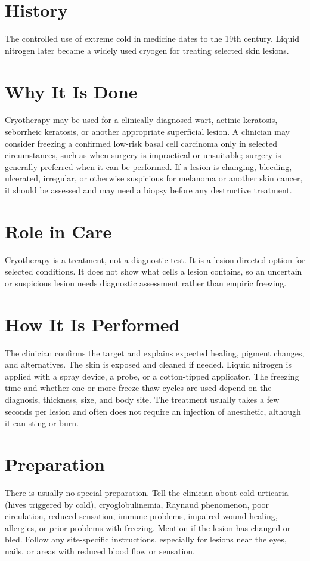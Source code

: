 \section*{History}
The controlled use of extreme cold in medicine dates to the 19th century. Liquid nitrogen later became a widely used cryogen for treating selected skin lesions.

\section*{Why It Is Done}
Cryotherapy may be used for a clinically diagnosed wart, actinic keratosis, seborrheic keratosis, or another appropriate superficial lesion. A clinician may consider freezing a confirmed low-risk basal cell carcinoma only in selected circumstances, such as when surgery is impractical or unsuitable; surgery is generally preferred when it can be performed. If a lesion is changing, bleeding, ulcerated, irregular, or otherwise suspicious for melanoma or another skin cancer, it should be assessed and may need a biopsy before any destructive treatment.

\section*{Role in Care}
Cryotherapy is a treatment, not a diagnostic test. It is a lesion-directed option for selected conditions. It does not show what cells a lesion contains, so an uncertain or suspicious lesion needs diagnostic assessment rather than empiric freezing.

\section*{How It Is Performed}
The clinician confirms the target and explains expected healing, pigment changes, and alternatives. The skin is exposed and cleaned if needed. Liquid nitrogen is applied with a spray device, a probe, or a cotton-tipped applicator. The freezing time and whether one or more freeze-thaw cycles are used depend on the diagnosis, thickness, size, and body site. The treatment usually takes a few seconds per lesion and often does not require an injection of anesthetic, although it can sting or burn.

\section*{Preparation}
There is usually no special preparation. Tell the clinician about cold urticaria (hives triggered by cold), cryoglobulinemia, Raynaud phenomenon, poor circulation, reduced sensation, immune problems, impaired wound healing, allergies, or prior problems with freezing. Mention if the lesion has changed or bled. Follow any site-specific instructions, especially for lesions near the eyes, nails, or areas with reduced blood flow or sensation.

